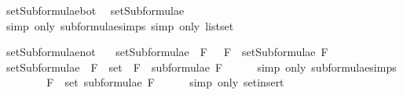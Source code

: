 \begin{isabellebody}
\endisatagproof
{\isafoldproof}%
%
\isadelimproof
%
\endisadelimproof
%
\begin{isamarkuptext}%
%
\end{isamarkuptext}\isamarkuptrue%
\isamarkupfalse%
\ setSubformulae{\isacharunderscore}bot{\isacharcolon}\isanewline
\ \ {\isachardoublequoteopen}setSubformulae\ {\isacharparenleft}{\isasymbottom}{\isacharparenright}\ {\isacharequal}\ {\isacharbraceleft}{\isasymbottom}{\isacharbraceright}{\isachardoublequoteclose}\isanewline
%
\isadelimproof
\ \ \ \ %
\endisadelimproof
%
\isatagproof
{}\isamarkupfalse%
\ {\isacharparenleft}simp\ only{\isacharcolon}\ subformulae{\isachardot}simps{\isacharparenleft}{}{\isacharparenright}{\isacharcomma}\ simp\ only{\isacharcolon}\ list{\isachardot}set{\isacharparenright}%
\endisatagproof
{\isafoldproof}%
%
\isadelimproof
%
\endisadelimproof
%
\begin{isamarkuptext}%
%
\end{isamarkuptext}\isamarkuptrue%
\isamarkupfalse%
\ setSubformulae{\isacharunderscore}not{\isacharcolon}\isanewline
\ \ \ {\isachardoublequoteopen}setSubformulae\ {\isacharparenleft}\isactrlbold {\isasymnot}\ F{\isacharparenright}\ {\isacharequal}\ {\isacharbraceleft}\isactrlbold {\isasymnot}\ F{\isacharbraceright}\ {\isasymunion}\ setSubformulae\ F{\isachardoublequoteclose}\isanewline
%
\isadelimproof
%
\endisadelimproof
%
\isatagproof
{}\isamarkupfalse%
\ {\isacharminus}\isanewline
\ \ \isamarkupfalse%
\ {\isachardoublequoteopen}setSubformulae\ {\isacharparenleft}\isactrlbold {\isasymnot}\ F{\isacharparenright}\ {\isacharequal}\ set\ {\isacharparenleft}\isactrlbold {\isasymnot}\ F\ {\isacharhash}\ subformulae\ F{\isacharparenright}{\isachardoublequoteclose}\isanewline
\ \ \ \ \isamarkupfalse%
\ {\isacharparenleft}simp\ only{\isacharcolon}\ subformulae{\isachardot}simps{\isacharparenleft}{}{\isacharparenright}{\isacharparenright}\isanewline
\ \ \isamarkupfalse%
\ \isamarkupfalse%
\ {\isachardoublequoteopen}{\isasymdots}\ {\isacharequal}\ {\isacharbraceleft}\isactrlbold {\isasymnot}\ F{\isacharbraceright}\ {\isasymunion}\ set\ {\isacharparenleft}subformulae\ F{\isacharparenright}{\isachardoublequoteclose}\isanewline
\ \ \ \ \isamarkupfalse%
\ {\isacharparenleft}simp\ only{\isacharcolon}\ set{\isacharunderscore}insert{\isacharparenright}\isanewline

\end{isabellebody}
